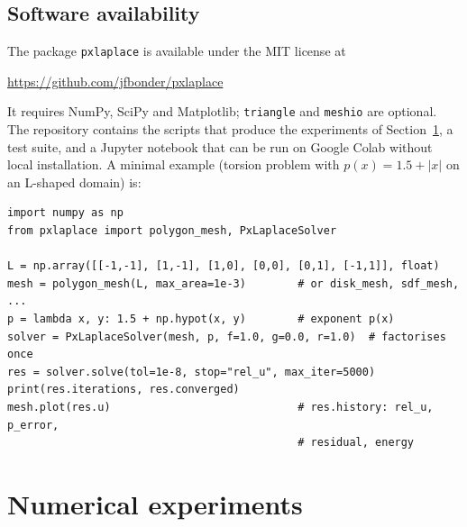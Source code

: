 \documentclass[11pt]{amsart}
\theoremstyle{definition}
\theoremstyle{remark}
\numberwithin{equation}{section}
\begin{document}
\subsection{Software availability}
The package \texttt{pxlaplace} is available under the MIT license at
\begin{center}
\url{https://github.com/jfbonder/pxlaplace}
\end{center}
It requires NumPy, SciPy and Matplotlib; \texttt{triangle} and \texttt{meshio} are optional. The repository contains the scripts that produce the experiments of Section~\ref{sec.experiments}, a test suite, and a Jupyter notebook that can be run on Google Colab without local installation. A minimal example (torsion problem with $p(x)=1.5+|x|$ on an L-shaped domain) is:
\begin{lstlisting}
import numpy as np
from pxlaplace import polygon_mesh, PxLaplaceSolver

L = np.array([[-1,-1], [1,-1], [1,0], [0,0], [0,1], [-1,1]], float)
mesh = polygon_mesh(L, max_area=1e-3)        # or disk_mesh, sdf_mesh, ...
p = lambda x, y: 1.5 + np.hypot(x, y)        # exponent p(x)
solver = PxLaplaceSolver(mesh, p, f=1.0, g=0.0, r=1.0)  # factorises once
res = solver.solve(tol=1e-8, stop="rel_u", max_iter=5000)
print(res.iterations, res.converged)
mesh.plot(res.u)                             # res.history: rel_u, p_error,
                                             # residual, energy
\end{lstlisting}

\section{Numerical experiments}\label{sec.experiments}
\end{document}
